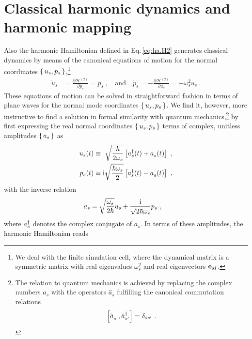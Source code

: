 


\newpage

\section{Classical harmonic dynamics and harmonic mapping}
Also the harmonic Hamiltonian defined in Eq.\,\eqref{eq:ha.H2} generates classical dynamics by means of the canonical equations of motion for the normal coordinates $\set{ u_s, p_s}$,\footnote{We deal with the finite simulation cell, where the dynamical matrix is a symmetric matrix with real eigenvalues $\omega^2_s$ and real eigenvectors ${\bf e}_{sI}$.}
\begin{align}
\dot{u}_s
& = \frac{\partial \mathcal H^{(2)}}{\partial p_s}
= p_s~,\quad\text{and}\quad
\dot{p}_s
= - \frac{\partial \mathcal H^{(2)}}{\partial u_s}
= - \omega^2_s u_s~.
\label{eq:ha.canonical.eom}
\end{align}
These equations of motion can be solved in straightforward fashion in terms of plane waves for the normal mode coordinates $\set{u_s, p_s}$. We find it, however, more instructive to find a solution in formal similarity with quantum mechanics,\footnote{The relation to quantum mechanics is achieved by replacing the complex numbers $a_s$ with the operators $\hat{a}_s$ fulfilling the canonical commutation relations $$\left[ \fD{\hat{a}}_{\fP s}, \D{\hat a}_{s'} \right] = \delta_{ss'}~.$$} by first expressing the real normal coordinates $\set{u_s, p_s}$ terms of complex, unitless amplitudes $\set{a_s}$ as
\begin{subequations}
	\label{eq:u_s.amplitudes}
	\begin{align}
	u_s (t) 
	&\equiv ~ \sqrt{\frac{\hbar}{2 \omega_s}} \left[ \D a_s (t) + \fD a_s (t) \right]~, \\
	p_s (t) 
	&\equiv \im \sqrt{\frac{\hbar \omega_s}{2}} \left[ \D a_s (t) - \fD a_s (t) \right]~,
	\end{align}
\end{subequations}
with the inverse relation
\begin{align}
	a_s
	&= \sqrt{\frac{\omega_s}{2 \hbar}} u_s + \frac{\im}{\sqrt{2 \hbar \omega_s}} p_s 	\label{eq:a_st}~,
\end{align}
where ${a}^\dagger_s$ denotes the complex conjugate of $a_s$. 
In terms of these amplitudes, the harmonic Hamiltonian reads
